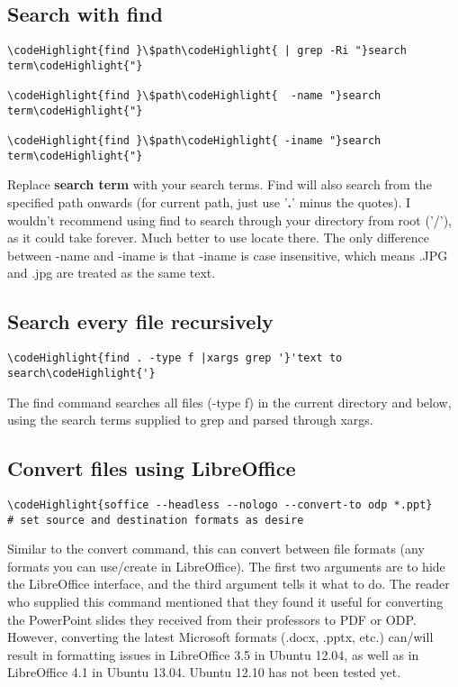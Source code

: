 \documentclass[12pt,a4paper]{article}
\begin{document}
\subsection{Search with find}
\begin{Verbatim}[commandchars=\\\{\}]
\codeHighlight{find }\$path\codeHighlight{ | grep -Ri "}search term\codeHighlight{"}

\codeHighlight{find }\$path\codeHighlight{  -name "}search term\codeHighlight{"}

\codeHighlight{find }\$path\codeHighlight{ -iname "}search term\codeHighlight{"}
\end{Verbatim}
Replace \textbf{search term} with your search terms.  Find will also search from the specified path onwards (for current path, just use '\textbf{.}' minus the quotes). I wouldn't recommend using find to search through your directory from root ('/'), as it could take forever. Much better to use locate there. The only difference between -name and -iname is that -iname is case insensitive, which means .JPG and .jpg are treated as the same text.

\subsection{Search every file recursively}
\begin{Verbatim}[commandchars=\\\{\}]
\codeHighlight{find . -type f |xargs grep '}'text to search\codeHighlight{'}
\end{Verbatim}
The find command searches all files (-type f) in the current directory and below, using the search terms supplied to grep and parsed through xargs.

\subsection{Convert files using LibreOffice}
\begin{Verbatim}[commandchars=\\\{\}]
\codeHighlight{soffice --headless --nologo --convert-to odp *.ppt}
# set source and destination formats as desire
\end{Verbatim}
Similar to the convert command, this can convert between file formats (any formats you can use/create in LibreOffice). The first two arguments are to hide the LibreOffice interface, and the third argument tells it what to do.  The reader who supplied this command mentioned that they found it useful for converting the PowerPoint slides they received from their professors to PDF or ODP. However, converting the latest Microsoft formats (.docx, .pptx, etc.) can/will result in formatting issues in LibreOffice 3.5 in Ubuntu 12.04, as well as in LibreOffice 4.1 in Ubuntu 13.04. Ubuntu 12.10 has not been tested yet.
\end{document}
